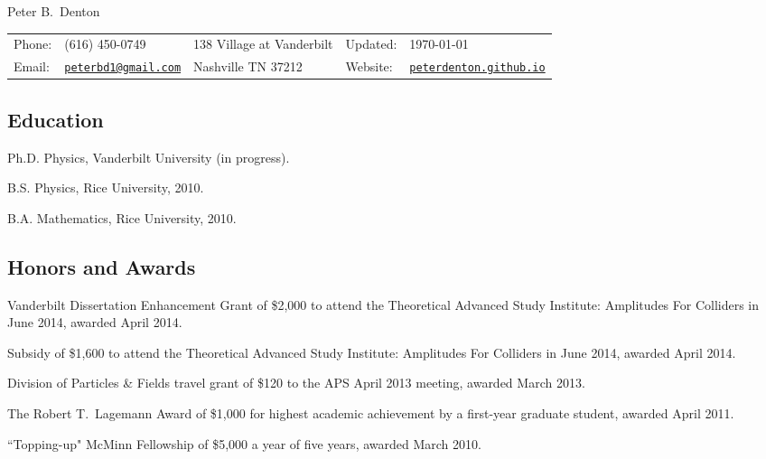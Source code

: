 \documentclass[letterpaper]{article}
\def\name{Peter B.~Denton}
\renewenvironment{itemize}{
\begin{list}{}{
\setlength{\leftmargin}{1.5em}
}
}{
\end{list}
}
\begin{document}
{\huge \name}

\vspace{0.1in}

\begin{tabular}{ll|l|ll}
Phone: & (616) 450-0749 & 138 Village at Vanderbilt & Updated: & \today\\
Email: & \href{mailto:peterbd1@gmail.com}{\tt peterbd1@gmail.com} & Nashville TN 37212 & Website: & 
\href{http://peterdenton.github.io}{\tt peterdenton.github.io}
\end{tabular}

\subsection*{Education}
\begin{itemize}
\item Ph.D. Physics, Vanderbilt University (in progress).
\item B.S. Physics, Rice University, 2010.
\item B.A. Mathematics, Rice University, 2010.
\end{itemize}

\subsection*{Honors and Awards}
\begin{itemize}
\item Vanderbilt Dissertation Enhancement Grant of \$2,000 to attend the Theoretical Advanced Study Institute: Amplitudes For Colliders
in June 2014, awarded April 2014.
\item Subsidy of \$1,600 to attend the Theoretical Advanced Study Institute: Amplitudes For Colliders in June 2014, awarded April 2014.
\item Division of Particles \& Fields travel grant of \$120 to the APS April 2013 meeting, awarded March 2013.
\item The Robert T.~Lagemann Award of \$1,000 for highest academic achievement by a first-year graduate student, awarded April 2011.
\item ``Topping-up" McMinn Fellowship of \$5,000 a year of five years, awarded March 2010.
\end{itemize}
\end{document}
